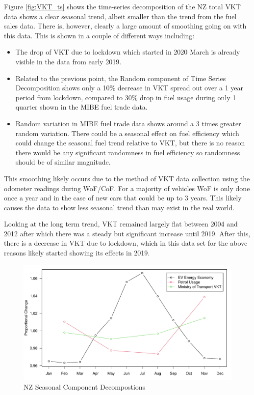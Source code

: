 \documentclass[
]{article}
\begin{document}
Figure \ref{fig:VKT_ts} shows the time-series decomposition of the NZ
total VKT data shows a clear seasonal trend, albeit smaller than the
trend from the fuel sales data. There is, however, clearly a large
amount of smoothing going on with this data. This is shown in a couple
of different ways including:

\begin{itemize}
\item The drop of VKT due to lockdown which started in 2020 March is already visible in the data from early 2019. 
\item Related to the previous point, the Random component of Time Series Decomposition shows only a 10\% decrease in VKT spread out over a 1 year period from lockdown, compared to 30\% drop in fuel usage during only 1 quarter shown in the MIBE fuel trade data. 
\item Random variation in MIBE fuel trade data shows around a 3 times greater random variation. There could be a seasonal effect on fuel efficiency which could change the seasonal fuel trend relative to VKT, but there is no reason there would be any significant randomness in fuel efficiency so randomness should be of similar magnitude.
\end{itemize}

This smoothing likely occurs due to the method of VKT data collection
using the odometer readings during WoF/CoF. For a majority of vehicles
WoF is only done once a year and in the case of new cars that could be
up to 3 years. This likely causes the data to show less seasonal trend
than may exist in the real world.

Looking at the long term trend, VKT remained largely flat between 2004
and 2012 after which there was a steady but significant increase until
2019. After this, there is a decrease in VKT due to lockdown, which in
this data set for the above reasons likely started showing its effects
in 2019.

\begin{figure}
\centering
\includegraphics{mixed_model_files/figure-latex/petrol_VKT_vs_eff-1.pdf}
\caption{NZ Seasonal Component Decompostions}
\end{figure}
\end{document}
